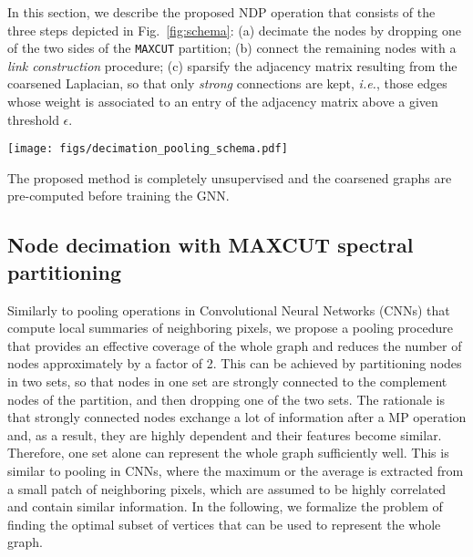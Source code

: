 \documentclass[journal]{IEEEtran}
\newcommand{\maxcut}{\texttt{\small{MAXCUT}}}
\begin{document}
In this section, we describe the proposed NDP operation that consists of the three steps depicted in Fig.~\ref{fig:schema}: 
(a) decimate the nodes by dropping one of the two sides of the \maxcut{} partition; 
(b) connect the remaining nodes with a \textit{link construction} procedure; 
(c) sparsify the adjacency matrix resulting from the coarsened Laplacian, so that only \textit{strong} connections are kept, \textit{i.e.}, those edges whose weight is associated to an entry of the adjacency matrix above a given threshold $\epsilon$.
\begin{figure*}[!ht]
    \centering
    \texttt{[image: figs/decimation\_pooling\_schema.pdf]}    
    \caption{Depiction of the proposed graph coarsening procedure. 
    First, the nodes are partitioned in two sets according to a \maxcut{} objective and then are decimated by dropping one of the two sets ($\mathcal{V}^{-}$). Then, a coarsened Laplacian is built by connecting the remaining nodes with a graph reduction procedure. 
    Finally, the edges with low weights in the new adjacency matrix obtained from the coarsened Laplacian are dropped to make the resulting graph sparser.}
    \label{fig:schema}
\end{figure*}
The proposed method is completely unsupervised and the coarsened graphs are pre-computed before training the GNN.


\subsection{Node decimation with MAXCUT spectral partitioning}
\label{sec:maxcut}

Similarly to pooling operations in Convolutional Neural Networks (CNNs) that compute local summaries of neighboring pixels, we propose a pooling procedure that provides an effective coverage of the whole graph and reduces the number of nodes approximately by a factor of 2.
This can be achieved by partitioning nodes in two sets, so that nodes in one set are strongly connected to the complement nodes of the partition, and then dropping one of the two sets.
The rationale is that strongly connected nodes exchange a lot of information after a MP operation and, as a result, they are highly dependent and their features become similar.
Therefore, one set alone can represent the whole graph sufficiently well.
This is similar to pooling in CNNs, where the maximum or the average is extracted from a small patch of neighboring pixels, which are assumed to be highly correlated and contain similar information.
In the following, we formalize the problem of finding the optimal subset of vertices that can be used to represent the whole graph.
\end{document}
